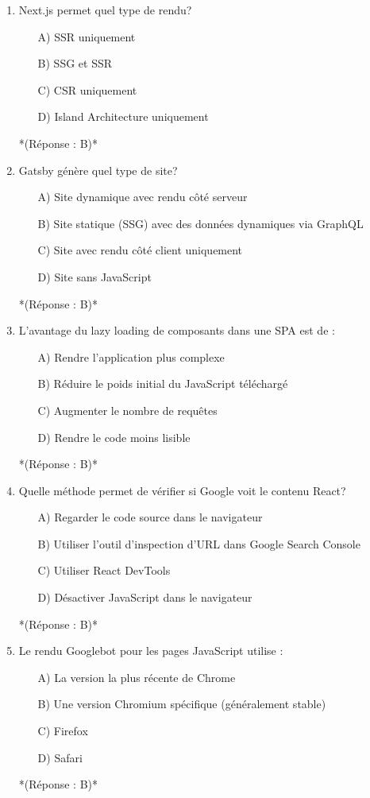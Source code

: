 \documentclass[12pt,a4paper,twoside]{report}
\begin{document}
\begin{enumerate}
\item Next.js permet quel type de rendu?
\begin{itemize}
\item[A)] SSR uniquement
\item[B)] SSG et SSR
\item[C)] CSR uniquement
\item[D)] Island Architecture uniquement
\end{itemize}
*(Réponse : B)*

\item Gatsby génère quel type de site?
\begin{itemize}
\item[A)] Site dynamique avec rendu côté serveur
\item[B)] Site statique (SSG) avec des données dynamiques via GraphQL
\item[C)] Site avec rendu côté client uniquement
\item[D)] Site sans JavaScript
\end{itemize}
*(Réponse : B)*

\item L'avantage du lazy loading de composants dans une SPA est de :
\begin{itemize}
\item[A)] Rendre l'application plus complexe
\item[B)] Réduire le poids initial du JavaScript téléchargé
\item[C)] Augmenter le nombre de requêtes
\item[D)] Rendre le code moins lisible
\end{itemize}
*(Réponse : B)*

\item Quelle méthode permet de vérifier si Google voit le contenu React?
\begin{itemize}
\item[A)] Regarder le code source dans le navigateur
\item[B)] Utiliser l'outil d'inspection d'URL dans Google Search Console
\item[C)] Utiliser React DevTools
\item[D)] Désactiver JavaScript dans le navigateur
\end{itemize}
*(Réponse : B)*

\item Le rendu Googlebot pour les pages JavaScript utilise :
\begin{itemize}
\item[A)] La version la plus récente de Chrome
\item[B)] Une version Chromium spécifique (généralement stable)
\item[C)] Firefox
\item[D)] Safari
\end{itemize}
*(Réponse : B)*


\end{enumerate}
\end{document}
